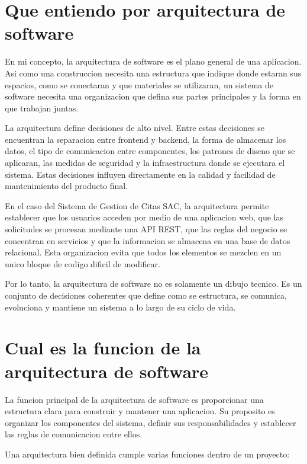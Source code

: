 \documentclass[12pt,letterpaper]{article}
\begin{document}
\section{Que entiendo por arquitectura de software}

En mi concepto, la arquitectura de software es el plano general de una aplicacion. Asi como una construccion necesita una estructura que indique donde estaran sus espacios, como se conectaran y que materiales se utilizaran, un sistema de software necesita una organizacion que defina sus partes principales y la forma en que trabajan juntas.

La arquitectura define decisiones de alto nivel. Entre estas decisiones se encuentran la separacion entre frontend y backend, la forma de almacenar los datos, el tipo de comunicacion entre componentes, los patrones de diseno que se aplicaran, las medidas de seguridad y la infraestructura donde se ejecutara el sistema. Estas decisiones influyen directamente en la calidad y facilidad de mantenimiento del producto final.

En el caso del Sistema de Gestion de Citas SAC, la arquitectura permite establecer que los usuarios acceden por medio de una aplicacion web, que las solicitudes se procesan mediante una API REST, que las reglas del negocio se concentran en servicios y que la informacion se almacena en una base de datos relacional. Esta organizacion evita que todos los elementos se mezclen en un unico bloque de codigo dificil de modificar.

Por lo tanto, la arquitectura de software no es solamente un dibujo tecnico. Es un conjunto de decisiones coherentes que define como se estructura, se comunica, evoluciona y mantiene un sistema a lo largo de su ciclo de vida.

\section{Cual es la funcion de la arquitectura de software}

La funcion principal de la arquitectura de software es proporcionar una estructura clara para construir y mantener una aplicacion. Su proposito es organizar los componentes del sistema, definir sus responsabilidades y establecer las reglas de comunicacion entre ellos.

Una arquitectura bien definida cumple varias funciones dentro de un proyecto:
\end{document}
